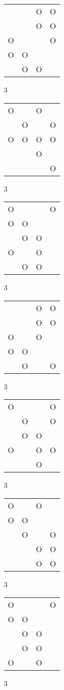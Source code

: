 \begin{tabular}{|m{0.2cm}m{0.2cm}m{0.2cm}m{0.2cm}|}\hline
 & &O&O\\
 & &O&O\\
O& & &O\\
O&O& & \\
 &O&O& \\
\hline\end{tabular}3
\begin{tabular}{|m{0.2cm}m{0.2cm}m{0.2cm}m{0.2cm}|}\hline
O& &O& \\
 &O& &O\\
O&O&O&O\\
 & &O& \\
 & & &O\\
\hline\end{tabular}3
\begin{tabular}{|m{0.2cm}m{0.2cm}m{0.2cm}m{0.2cm}|}\hline
O& & &O\\
O&O& & \\
 &O&O& \\
O& &O& \\
 &O&O& \\
\hline\end{tabular}3
\begin{tabular}{|m{0.2cm}m{0.2cm}m{0.2cm}m{0.2cm}|}\hline
 & &O&O\\
 & &O&O\\
O& &O& \\
O&O& & \\
 &O& &O\\
\hline\end{tabular}3
\begin{tabular}{|m{0.2cm}m{0.2cm}m{0.2cm}m{0.2cm}|}\hline
O& & &O\\
 &O& &O\\
 &O&O& \\
O& &O&O\\
 & &O& \\
\hline\end{tabular}3
\begin{tabular}{|m{0.2cm}m{0.2cm}m{0.2cm}m{0.2cm}|}\hline
O& &O& \\
O&O& & \\
 &O& &O\\
 & &O&O\\
 & &O&O\\
\hline\end{tabular}3
\begin{tabular}{|m{0.2cm}m{0.2cm}m{0.2cm}m{0.2cm}|}\hline
O& & &O\\
O&O& & \\
 &O&O& \\
 &O&O& \\
O& &O& \\
\hline\end{tabular}3

